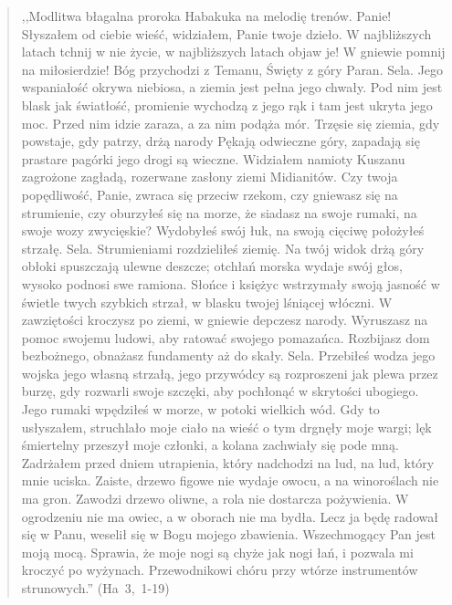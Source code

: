 \documentclass[10pt,a4paper,oneside]{article}
\begin{document}
\begin{quote}
,,Modlitwa błagalna proroka Habakuka na melodię trenów. Panie! Słyszałem od ciebie wieść, widziałem, Panie twoje dzieło. W najbliższych latach tchnij w nie życie, w najbliższych latach objaw je! W gniewie pomnij na miłosierdzie! Bóg przychodzi z Temanu, Święty z góry Paran. Sela. Jego wspaniałość okrywa niebiosa, a ziemia jest pełna jego chwały. Pod nim jest blask jak światłość, promienie wychodzą z jego rąk i tam jest ukryta jego moc. Przed nim idzie zaraza, a za nim podąża mór. Trzęsie się ziemia, gdy powstaje, gdy patrzy, drżą narody Pękają odwieczne góry, zapadają się prastare pagórki jego drogi są wieczne. Widziałem namioty Kuszanu zagrożone zagładą, rozerwane zasłony ziemi Midianitów. Czy twoja popędliwość, Panie, zwraca się przeciw rzekom, czy gniewasz się na strumienie, czy oburzyłeś się na morze, że siadasz na swoje rumaki, na swoje wozy zwycięskie? Wydobyłeś swój łuk, na swoją cięciwę położyłeś strzałę. Sela. Strumieniami rozdzieliłeś ziemię. Na twój widok drżą góry obłoki spuszczają ulewne deszcze; otchłań morska wydaje swój głos, wysoko podnosi swe ramiona. Słońce i księżyc wstrzymały swoją jasność w świetle twych szybkich strzał, w blasku twojej lśniącej włóczni. W zawziętości kroczysz po ziemi, w gniewie depczesz narody. Wyruszasz na pomoc swojemu ludowi, aby ratować swojego pomazańca. Rozbijasz dom bezbożnego, obnażasz fundamenty aż do skały. Sela. Przebiłeś wodza jego wojska jego własną strzałą, jego przywódcy są rozproszeni jak plewa przez burzę, gdy rozwarli swoje szczęki, aby pochłonąć w skrytości ubogiego. Jego rumaki wpędziłeś w morze, w potoki wielkich wód. Gdy to usłyszałem, struchlało moje ciało na wieść o tym drgnęły moje wargi; lęk śmiertelny przeszył moje członki, a kolana zachwiały się pode mną. Zadrżałem przed dniem utrapienia, który nadchodzi na lud, na lud, który mnie uciska. Zaiste, drzewo figowe nie wydaje owocu, a na winoroślach nie ma gron. Zawodzi drzewo oliwne, a rola nie dostarcza pożywienia. W ogrodzeniu nie ma owiec, a w oborach nie ma bydła. Lecz ja będę radował się w Panu, weselił się w Bogu mojego zbawienia. Wszechmogący Pan jest moją mocą. Sprawia, że moje nogi są chyże jak nogi łań, i pozwala mi kroczyć po wyżynach. Przewodnikowi chóru przy wtórze instrumentów strunowych.'' (Ha~3,~1-19)
\end{quote}
\end{document}
